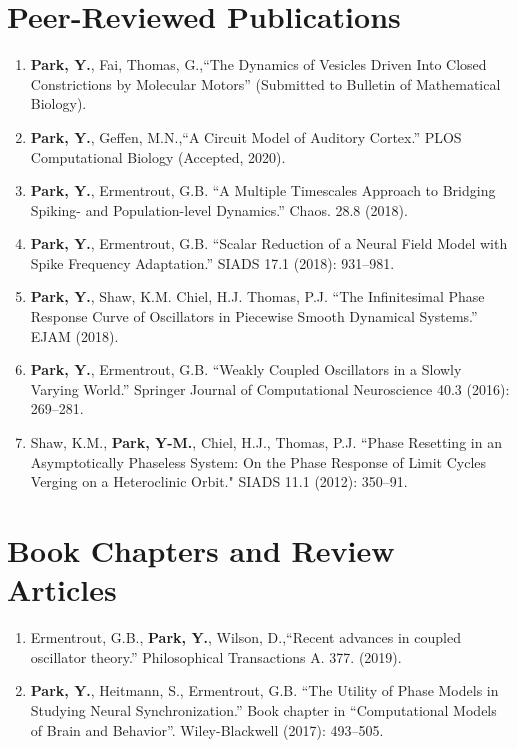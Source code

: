 \documentclass[a4paper,10pt]{article}
\begin{document}
\section{Peer-Reviewed Publications}
\noindent
\renewcommand\labelitemi{\tiny$\bullet$}
\begin{enumerate}[leftmargin=.225in,rightmargin=.1in,itemsep=2pt]
    \item \textbf{Park, Y.}, Fai, Thomas, G.,``The Dynamics of Vesicles Driven Into Closed Constrictions by Molecular Motors'' (Submitted to Bulletin of Mathematical Biology).
    \item \textbf{Park, Y.}, Geffen, M.N.,``A Circuit Model of Auditory Cortex.'' PLOS Computational Biology (Accepted, 2020).
    \item \textbf{Park, Y.}, Ermentrout, G.B. ``A Multiple Timescales Approach to Bridging Spiking- and Population-level Dynamics.'' Chaos. 28.8 (2018).
    \item \textbf{Park, Y.}, Ermentrout, G.B. ``Scalar Reduction of a Neural Field Model with Spike Frequency Adaptation.'' SIADS 17.1 (2018): 931--981.
    \item \textbf{Park, Y.}, Shaw, K.M. Chiel, H.J. Thomas, P.J. ``The Infinitesimal Phase Response Curve of Oscillators in Piecewise Smooth Dynamical Systems.'' EJAM (2018).
    \item \textbf{Park, Y.}, Ermentrout, G.B. ``Weakly Coupled Oscillators in a Slowly Varying World.'' Springer Journal of Computational Neuroscience 40.3 (2016): 269--281.
    \item Shaw, K.M., \textbf{Park, Y-M.}, Chiel, H.J., Thomas, P.J. ``Phase Resetting in an Asymptotically Phaseless System: On the Phase Response of Limit Cycles Verging on a Heteroclinic Orbit." SIADS 11.1 (2012): 350--91.
\end{enumerate}

\section{Book Chapters and Review Articles}
\noindent
\renewcommand\labelitemi{\tiny$\bullet$}
\begin{enumerate}[leftmargin=.225in,rightmargin=.1in,itemsep=2pt]
    \item Ermentrout, G.B.,  \textbf{Park, Y.}, Wilson, D.,``Recent advances in coupled oscillator theory.'' Philosophical Transactions A. 377. (2019).
    \item \textbf{Park, Y.}, Heitmann, S., Ermentrout, G.B. ``The Utility of Phase Models in Studying Neural Synchronization.'' Book chapter in ``Computational Models of Brain and Behavior''. Wiley-Blackwell (2017): 493--505.
\end{enumerate}
\end{document}
